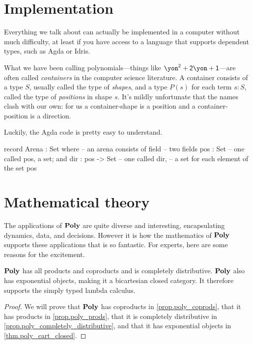 \documentclass[Book-Poly]{subfiles}
\begin{document}
\section{Implementation} \label{sec.poly.intro.code}

Everything we talk about can actually be implemented in a computer without much difficulty, at least if you have access to a language that supports dependent types, such as Agda or Idris.

What we have been calling polynomials---things like $\yon^\2+\2\yon+\1$---are often called \emph{containers} in the computer science literature. A container consists of a type $S$, usually called the type of \emph{shapes}, and a type $P(s)$ for each term $s:S$, called the type of \emph{positions} in shape $s$. It's mildly unfortunate that the names clash with our own: for us a container-shape is a position and a container-position is a direction.

Luckily, the Agda code is pretty easy to understand.
\begin{agda}
record Arena : Set where  -- an arena consists of 
   field                      -- two fields
     pos : Set                -- one called pos, a set; and
     dir : pos -> Set         -- one called dir,
                              -- a set for each element of the set pos
\end{agda}

\section{Mathematical theory} \label{sec.poly.intro.math_theory}

The applications of $\mathbf{Poly}$ are quite diverse and interesting, encapsulating dynamics, data, and decisions. However it is how the mathematics of $\mathbf{Poly}$ supports these applications that is so fantastic. For experts, here are some reasons for the excitement.

\begin{proposition}
$\mathbf{Poly}$ has all products and coproducts and is completely distributive.
$\mathbf{Poly}$ also has exponential objects, making it a bicartesian closed category.
It therefore supports the simply typed lambda calculus.
\end{proposition}
\begin{proof}
We will prove that $\mathbf{Poly}$ has coproducts in \cref{prop.poly_coprods}, that it has products in \cref{prop.poly_prods}, that it is completely distributive in \cref{prop.poly_completely_distributive}, and that it has exponential objects in \cref{thm.poly_cart_closed}.
\end{proof}
\end{document}
